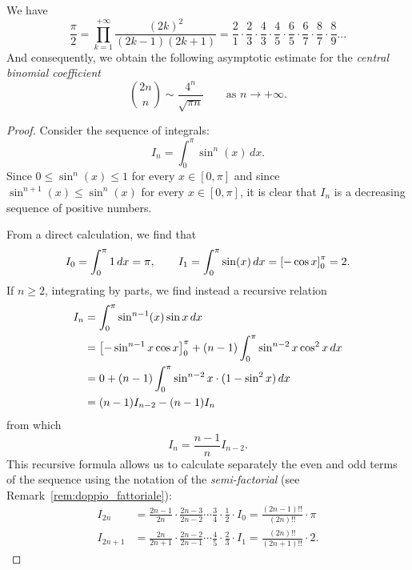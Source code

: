 \begin{theorem}
\label{th:wallis}%
\mymark{*}%
%
%
%
%
We have
\[
  \frac{\pi}{2}
  = \prod_{k=1}^{+\infty} \frac{(2k)^2}{(2k-1)(2k+1)}
  = \frac{2}{1}
  \cdot \frac{2}{3}
  \cdot \frac{4}{3}
  \cdot \frac{4}{5}
  \cdot \frac{6}{5}
  \cdot \frac{6}{7}
  \cdot \frac{8}{7}
  \cdot \frac{8}{9}
  \dots
\]
And consequently, we obtain the following asymptotic estimate for the
\emph{central binomial coefficient}%
%
\[
 {2n \choose n} \sim \frac{4^n}{\sqrt{\pi n}}
 \qquad \text{as $n\to +\infty$.}
\]
\end{theorem}
%
\begin{proof}
Consider the sequence of integrals:
\[
  I_n = \int_0^\pi \sin^n(x)\, dx.
\]
Since $0\le \sin^n(x) \le 1$ for every $x\in [0,\pi]$ and since
$\sin^{n+1}(x)\le \sin^n(x)$ for every $x\in[0,\pi]$, it is clear that $I_n$ is
a decreasing sequence of positive numbers.

From a direct calculation, we find that
\[
  I_0 = \int_0^\pi 1\, dx = \pi, \qquad
  I_1 = \int_0^\pi \sin(x)\, dx = {\left[ -\cos x \right]}_0^\pi = 2.
\]
If $n\ge 2$,
integrating by parts, we find instead a recursive relation
\begin{align*}
 I_n &= \int_0^\pi \sin^{n-1}(x) \sin x\, dx \\
          &= {\left[ -\sin^{n-1} x \cos x  \right]}_0^\pi + (n-1)\int_0^\pi \sin^{n-2}
     x \cos^2 x \, dx \\
     &= 0 + (n-1)\int_0^\pi\sin^{n-2}x\cdot (1-\sin^2 x)\, dx \\
     &= (n-1) I_{n-2} - (n-1) I_{n}
\end{align*}
from which
\begin{equation}
\label{eq:187464}%
  I_n = \frac{n-1}{n} I_{n-2}.
\end{equation}
This recursive formula allows us to calculate separately the even and odd terms
of the sequence using the notation of the \emph{semi-factorial} (see
Remark~\ref{rem:doppio_fattoriale}):
\begin{align*}
  I_{2n}
    &= \frac{2n-1}{2n}\cdot \frac{2n-3}{2n-2} \cdots \frac {3}{4}\cdot
  \frac{1}{2} \cdot I_0
  = \frac{(2n-1)!!}{(2n)!!} \cdot \pi \\
  I_{2n+1} &= \frac{2n}{2n+1}\cdot \frac {2n-2}{2n-1} \cdots
  \frac{4}{5}\cdot \frac{2}{3} \cdot I_1
  = \frac{(2n)!!}{(2n+1)!!}\cdot 2.
\end{align*}


\end{proof}
